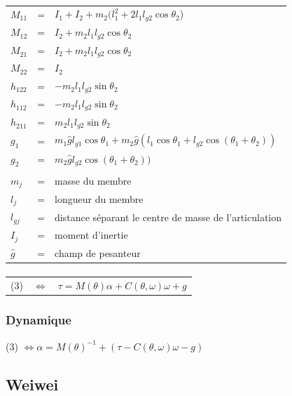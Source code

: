 \documentclass[pdftex,a4paper,11pt]{article}
\begin{document}
\paragraph{}
\begin{tabular}{lcl}
    $M_{11}$ & = & $I_1 + I_2 + m_2(l_1^2 + 2 l_1 l_{g2}\cos\theta_2$) \\
    $M_{12}$ & = & $I_2 + m_2l_1l_{g2}\cos\theta_2$ \\
    $M_{21}$ & = & $I_2 + m_2l_1l_{g2}\cos\theta_2$ \\
    $M_{22}$ & = & $I_2$ \\
    $h_{122}$ & = & $-m_2 l_1 l_{g2} \sin\theta_2$ \\
    $h_{112}$ & = & $-m_2 l_1 l_{g2} \sin\theta_2$ \\
    $h_{211}$ & = & $m_2 l_1 l_{g2} \sin\theta_2$ \\
    $g_1$ & = & $m_1 \hat{g} l_{g1} \cos\theta_1 + m_2 \hat{g} (l_1 \cos\theta_1 + l_{g2} \cos(\theta_1 + \theta_2))$ \\
    $g_2$ & = & $m_2 \hat{g} l_{g2} \cos(\theta_1 + \theta_2))$ \\
    & & \\
    $m_j$ & = & masse du membre \\
    $l_j$ & = & longueur du membre \\
    $l_{gj}$ & = & distance séparant le centre de masse de l'articulation \\
    $I_{j}$ & = & moment d'inertie \\
    $\hat{g}$ & = & champ de pesanteur \\
\end{tabular}

\paragraph{}
\begin{tabular}{lcl}
    (3) & $\Leftrightarrow$ & $\tau = M(\theta)\alpha + C(\theta, \omega) \omega + g$ \\
\end{tabular}

\subsubsection{Dynamique}
(3) $\Leftrightarrow \alpha = M(\theta)^{-1} + (\tau - C(\theta, \omega) \omega - g) $


\subsection{Weiwei}
\end{document}
